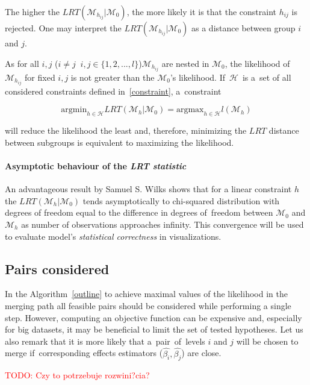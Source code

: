 \documentclass[12pt]{article}
\newcommand{\todo}{\textcolor{red}}
\newcommand{\M}{\mathcal{M}}
\begin{document}
The higher the $LRT(\M_{h_{ij}}|\M_0)$, the more likely it is that the constraint $h_{ij}$ is rejected. One may interpret the $LRT(\M_{h_{ij}}|\M_0)$ as a distance between group $i$ and $j$.

As for all $i,j$  ($i \neq j \;\; i,j \in \{1, 2, ..., l \}$)$\M_{h_{ij}}$ are nested in $\M_0$, the likelihood of $\M_{h_{ij}}$ for fixed $i,j$ is not greater than the $\M_0$'s likelihood. If~$\mathcal{H}$~is a~set of all considered constraints defined in~\eqref{constraint}, a~constraint 

\begin{equation} \label{maxLikelihood}
\mathrm{argmin}_{h \in \mathcal{H}} LRT(\M_h|\M_0) = \mathrm{argmax}_{h \in \mathcal{H}} l(\M_h)
\end{equation}

will reduce the likelihood the least and, therefore, minimizing the $LRT$ distance between subgroups is equivalent to maximizing the likelihood.

\paragraph{Asymptotic behaviour of the \emph{LRT statistic}}

An advantageous result by Samuel S. Wilks \citep{wilks1938large} shows that for a linear constraint $h$ the $LRT(\M_h|\M_0)$ tends asymptotically to chi-squared distribution with degrees of freedom equal to the difference in degrees of~freedom between $\M_0$ and $\M_h$ as number of observations approaches infinity. This convergence will be used to evaluate model's \emph{statistical correctness} in visualizations.



\subsection{Pairs considered}

In the Algorithm~\ref{outline} to achieve maximal values of the likelihood in the merging path all feasible pairs should be considered while performing a single step. However, 
computing an objective function can be expensive and, especially for big datasets, it may be beneficial to limit the set of tested hypotheses. Let us also remark that it is more likely that a~pair~of~levels $i$ and $j$ will be chosen to merge if~corresponding effects estimators ($\hat{\beta_i}, \hat{\beta_j}$) are close.

\todo{TODO: Czy to potrzebuje rozwini?cia?}
\end{document}
